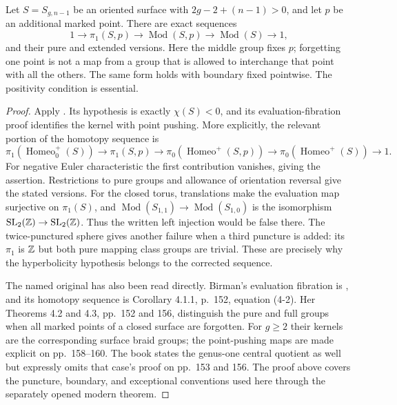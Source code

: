 \begin{proposition}\label{A6-birman}
Let $S=S_{g,n-1}$ be an oriented surface with $2g-2+(n-1)>0$, and let $p$ be an additional marked point. There are exact sequences
\[
 1\longrightarrow\pi_1(S,p)\longrightarrow
 \operatorname{Mod}(S,p)\longrightarrow\operatorname{Mod}(S)
 \longrightarrow1,
\]
and their pure and extended versions. Here the middle group fixes $p$; forgetting one point is not a map from a group that is allowed to interchange that point with all the others. The same form holds with boundary fixed pointwise. The positivity condition is essential.
\end{proposition}
\begin{proof}
Apply \cite[Theorem 4.6 and the remarks immediately following it]{FarbMargalit2012A567}. Its hypothesis is exactly $\chi(S)<0$, and its evaluation-fibration proof identifies the kernel with point pushing. More explicitly, the relevant portion of the homotopy sequence is
\[
 \pi_1(\operatorname{Homeo}_0^+(S))\longrightarrow
 \pi_1(S,p)\longrightarrow
 \pi_0(\operatorname{Homeo}^+(S,p))
 \longrightarrow \pi_0(\operatorname{Homeo}^+(S))
 \longrightarrow1.
\]
For negative Euler characteristic the first contribution vanishes, giving the assertion. Restrictions to pure groups and allowance of orientation reversal give the stated versions.
For the closed torus, translations make the evaluation map surjective on $\pi_1(S)$, and $\operatorname{Mod}(S_{1,1})\to\operatorname{Mod}(S_{1,0})$ is the isomorphism $\operatorname{SL}_2({\mathbb{Z}})\to\operatorname{SL}_2({\mathbb{Z}})$. Thus the written left injection would be false there. The twice-punctured sphere gives another failure when a third puncture is added: its $\pi_1$ is ${\mathbb{Z}}$ but both pure mapping class groups are trivial. These are precisely why the hyperbolicity hypothesis belongs to the corrected sequence.

The named original has also been read directly. Birman's evaluation fibration is \cite[Theorem 4.1, p.~151]{Birman1974A567}, and its homotopy sequence is Corollary 4.1.1, p.~152, equation (4-2). Her Theorems 4.2 and 4.3, pp.~152 and 156, distinguish the pure and full groups when all marked points of a closed surface are forgotten. For $g\ge2$ their kernels are the corresponding surface braid groups; the point-pushing maps are made explicit on pp.~158--160. The book states the genus-one central quotient as well but expressly omits that case's proof on pp.~153 and 156. The proof above covers the puncture, boundary, and exceptional conventions used here through the separately opened modern theorem.
\end{proof}

